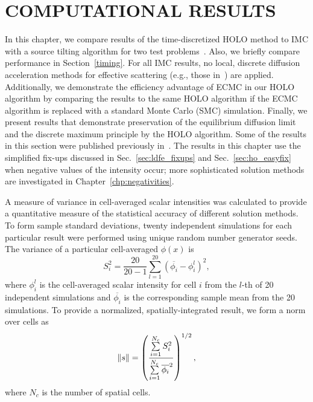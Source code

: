 
\chapter{\uppercase{Computational Results}}

In this chapter, we compare results of the time-discretized HOLO method to IMC with
a source tilting algorithm for two test problems~\cite{jayenne}.  Also, we
briefly compare performance in Section~\ref{timing}.  For all IMC results, no
local, discrete diffusion acceleration methods for effective scattering
(e.g., those in~\cite{imd,ddmc}) are applied.  Additionally, we demonstrate
the efficiency advantage of ECMC in our HOLO algorithm by comparing the results
to the same HOLO algorithm if the ECMC algorithm is replaced with a standard
Monte Carlo (SMC) simulation.  Finally, we present results that demonstrate
preservation of the equilibrium diffusion limit and the discrete maximum
principle by the HOLO algorithm.  Some of the results in this section were published
previously in~\cite{bolding_nse}.  
The results in this chapter use the simplified fix-ups discussed in
Sec.~\ref{sec:ldfe_fixups} and Sec.~\ref{sec:ho_easyfix} when negative values of the
intensity occur; more sophisticated solution methods are investigated in
Chapter~\ref{chp:negativities}.

A measure of variance in cell-averaged scalar intensities was
calculated to provide a quantitative measure of the statistical accuracy of different solution
methods.  To form sample standard deviations, twenty independent simulations for each
particular result were performed using unique random number generator seeds.
The variance of a particular cell-averaged $\phi(x)$ is 
\begin{equation} 
    S_i^2 =  \frac{20}{20-1} \sum_{l=1}^{20} \left(\overline{\phi_{i}} -
    \phi_{i}^l\right)^2,
\end{equation}
where $\phi_{i}^l$ is the cell-averaged scalar intensity for cell $i$ from the $l$-th of 20 independent simulations and
$\overline{\phi_{i}}$ is the corresponding sample mean from the 20 simulations. To
provide a normalized, spatially-integrated result, we form a norm over cells as 
\begin{equation}
    \ss = \left({\frac{\sum\limits_{i=1}^{N_c}
S_i^2}{\sum\limits_{i=1}^{N_c}\overline{\phi_{i}}^2}}\right)^{1/2},
\end{equation}
where $N_c$ is the number of spatial cells. 

